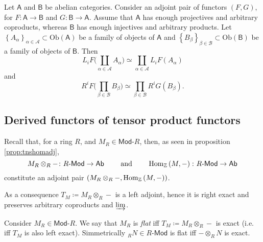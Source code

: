 \begin{prop}
	Let $\mathsf{A}$ and $\mathsf{B}$ be abelian categories.
	Consider an adjoint pair of functors $\left(F, G\right)$,
	for $F\colon\mathsf{A} \to \mathsf{B}$ and $G\colon\mathsf{B} \to \mathsf{A}$.
	Assume that $\mathsf{A}$ has enough projectives and arbitrary coproducts,
	whereas $\mathsf{B}$ has enough injectives and arbitrary products.
	Let $\left\{ A_\alpha \right\}_{\alpha \in \mathcal{A}} \subset \mathrm{Ob} \left(\mathsf{A}\right)$
	be a family of objects of $\mathsf{A}$
	and $\left\{ B_\beta \right\}_{\beta \in \mathcal{B}} \subset \mathrm{Ob} \left(\mathsf{B}\right)$
	be a family of objects of $\mathsf{B}$.
	Then
	\begin{equation}
		L_iF \bigg( \coprod_{\alpha \in \mathcal{A}} A_\alpha \bigg) \simeq
		\coprod_{\alpha \in \mathcal{A}} L_i F(A_\alpha)
	\end{equation} 
	and
	\begin{equation}
		R^iF \bigg( \prod_{\beta \in \mathcal{B}} B_\beta \bigg) \simeq
		\prod_{\beta \in \mathcal{B}} R^iG \left( B_\beta \right)
	.\end{equation} 
\end{prop} 

\subsection{Derived functors of tensor product functors}
Recall that, for a ring $R$, and $M_R \in \mathsf{Mod}\text{-}R$,
then, as seen in proposition \ref{prop:tnshomadj},
\begin{equation}
M_R \otimes_R - \colon R\text{-}\mathsf{Mod} \to \mathsf{Ab}
\qquad \text{ and } \qquad
\mathrm{Hom}_{\mathbb{Z}}\left( M, - \right)\colon R\text{-}\mathsf{Mod} \to \mathsf{Ab}
\end{equation} 
constitute an adjoint pair $\left(M_R \otimes_R -, \mathrm{Hom}_{ \mathbb{Z}}\left( M, - \right)\right)$.

As a consequence $T_M \coloneqq M_R \otimes_R -$ is a left adjoint, hence it is
right exact and preserves arbitrary coproducts and $\varinjlim$.

\begin{defn}
	Consider $M_R \in \mathsf{Mod}\text{-}R$.
	We say that $M_R$ is {\em flat} iff $T_M \coloneqq M_R \otimes_R -$ is exact
	(i.e. iff $T_M$ is also left exact).
	Simmetrically ${}_RN \in R\text{-}\mathsf{Mod}$ is flat iff $- \otimes_R N$ is exact.
\end{defn}

